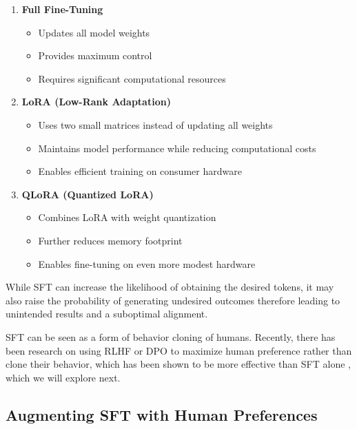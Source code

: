 \begin{enumerate}
\item \textbf{Full Fine-Tuning}
   \begin{itemize}
   \item Updates all model weights
   \item Provides maximum control
   \item Requires significant computational resources
   \end{itemize}
   
\item \textbf{LoRA (Low-Rank Adaptation)} 
   \begin{itemize}
   \item Uses two small matrices instead of updating all weights
   \item Maintains model performance while reducing computational costs
   \item Enables efficient training on consumer hardware
   \end{itemize}
   
\item \textbf{QLoRA (Quantized LoRA)} 
   \begin{itemize}
   \item Combines LoRA with weight quantization
   \item Further reduces memory footprint
   \item Enables fine-tuning on even more modest hardware
   \end{itemize}
\end{enumerate}

While SFT can increase the likelihood of obtaining the desired tokens, it may also raise the probability of generating undesired outcomes  therefore leading to unintended results and a suboptimal alignment. 

SFT can be seen as a form of behavior cloning of humans. Recently, there has been research on using RLHF or DPO  to maximize human preference rather than clone their behavior, which has been shown to be more effective than SFT alone , which we will explore next.

\subsection{Augmenting SFT with Human Preferences}

